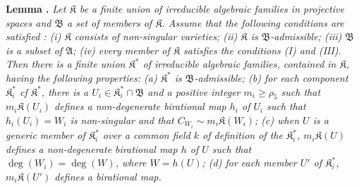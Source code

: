 \medskip
\noindent
{\bf Lemma .\label{art14-lem18}}
{\em Let $\mathfrak{K}$ be a finite union of irreducible algebraic families in projective spaces and $\mathfrak{B}$ a set of members of $\mathfrak{K}$. Assume that the following conditions are satisfied : {\rm(i)} $\mathfrak{K}$ consists of non-singular varieties; {\rm(ii)} $\mathfrak{K}$ is $\mathfrak{B}$-admissible; {\rm(iii)} $\mathfrak{B}$ is a subset of $\mathfrak{A}$; {\rm(iv)} every member of $\mathfrak{K}$ satisfies the conditions {\rm(I)} and {\rm(III)}. Then there is a finite union $\mathfrak{K}^{*}$ of irreducible algebraic families, contained in $\mathfrak{K}$, having the following properties: {\rm(a)} $\mathfrak{K}^{*}$ is $\mathfrak{B}$-admissible; {\rm(b)} for each component $\mathfrak{K}^{*}_{i}$ cf $\mathfrak{K}^{*}$, there is a $U_{i}\in \mathfrak{K}^{*}_{i}\cap \mathfrak{B}$ and a positive integer $m_{i}\geq \rho_{5}$ such that $m_{i}\mathfrak{K}(U_{i})$ defines a non-degenerate birational map $h_{i}$ of $U_{i}$ such that $h_{i}(U_{i})=W_{i}$ is non-singular and that $C_{W_{i}}\sim m_{i}\mathfrak{K}(W_{i})$; {\rm(c)} when $U$ is a generic member of $\mathfrak{K}^{*}_{i}$ over a common field $k$ of definition of the $\mathfrak{K}^{*}_{i}$, $m_{i}\mathfrak{K}(U)$ defines a non-degenerate birational map $h$ of $U$ such that $\deg(W_{i})=\deg(W)$, where $W=h(U)$; {\rm(d)} for each member $U'$ of $\mathfrak{K}^{*}_{i}$, $m_{i}\mathfrak{K}(U')$ defines a birational map.}

